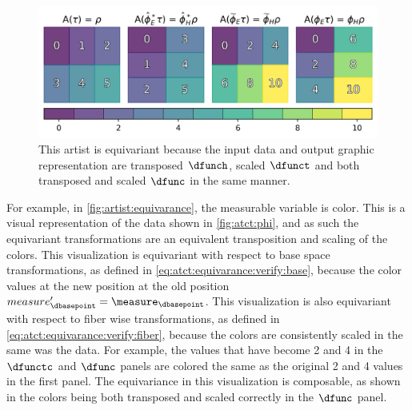 \documentclass[10pt,journal,compsoc]{IEEEtran}
\theoremstyle{definition}
\theoremstyle{remark}
\begin{document}
\begin{figure}[h!]
  \label{fig:artist:equivariance}
  \includegraphics[width=1\columnwidth]{equivariance.png}
  \caption{This artist is equivariant because the input data and output graphic representation are transposed $\dfunch$, scaled $\dfunct$ and both transposed and scaled $\dfunc$ in the same manner.}
\end{figure}
For example, in \autoref{fig:artist:equivarance}, the measurable variable is color. This is a visual representation of the data shown in \autoref{fig:atct:phi}, and as such the equivariant transformations are an equivalent transposition and scaling of the colors. This visualization is equivariant with respect to base space transformations, as defined in \autoref{eq:atct:equivarance:verify:base}, because the color values at the new position at the old position $measure_\dbasepoint^{\prime} = \measure_{\dbasepoint}$. This visualization is also equivariant with respect to fiber wise transformations, as defined in \autoref{eq:atct:equivarance:verify:fiber}, because the colors are consistently scaled in the same was the data. For example, the values that have become 2 and 4 in the $\dfunctc$ and $\dfunc$ panels are colored the same as the original 2 and 4 values in the first panel. The equivariance in this visualization is composable, as shown in the colors being both transposed and scaled correctly in the $\dfunc$ panel.
\end{document}
